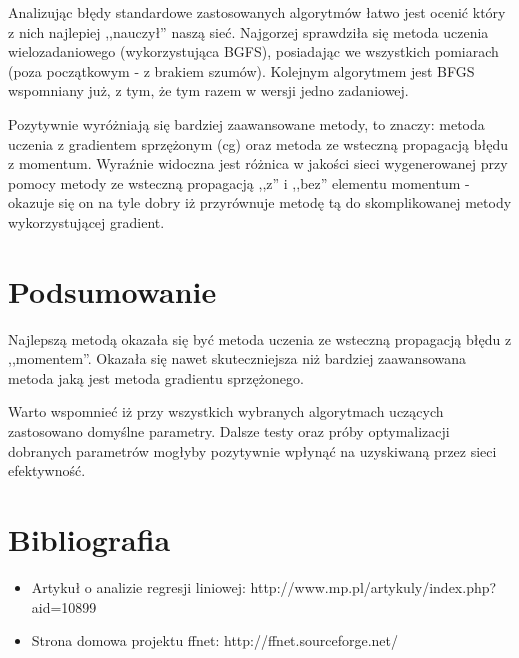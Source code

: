 \documentclass[a4paper]{article}
\begin{document}
Analizując błędy standardowe zastosowanych algorytmów łatwo jest ocenić który z nich
najlepiej ,,nauczył'' naszą sieć. Najgorzej sprawdziła się metoda uczenia wielozadaniowego (wykorzystująca BGFS),
posiadając we wszystkich pomiarach (poza początkowym - z brakiem szumów). Kolejnym algorytmem jest BFGS wspomniany już,
z tym, że tym razem w wersji jedno zadaniowej.

Pozytywnie wyróżniają się bardziej zaawansowane metody, to znaczy: metoda uczenia z gradientem sprzężonym (cg) oraz 
metoda ze wsteczną propagacją błędu z momentum. Wyraźnie widoczna jest różnica w jakości sieci wygenerowanej przy pomocy 
metody ze wsteczną propagacją ,,z'' i ,,bez'' elementu momentum - okazuje się on na tyle dobry iż przyrównuje metodę tą do 
skomplikowanej metody wykorzystującej gradient.

\section{Podsumowanie}
Najlepszą metodą okazała się być metoda uczenia ze wsteczną propagacją błędu z ,,momentem''.
Okazała się nawet skuteczniejsza niż bardziej zaawansowana metoda jaką jest metoda gradientu sprzężonego.

Warto wspomnieć iż przy wszystkich wybranych algorytmach uczących zastosowano domyślne parametry. 
Dalsze testy oraz próby optymalizacji dobranych parametrów mogłyby pozytywnie wpłynąć na uzyskiwaną przez sieci efektywność.

\section{Bibliografia}
\begin{itemize}
 \item Artykuł o analizie regresji liniowej: http://www.mp.pl/artykuly/index.php?aid=10899
 \item Strona domowa projektu ffnet: http://ffnet.sourceforge.net/
\end{itemize}
\end{document}
